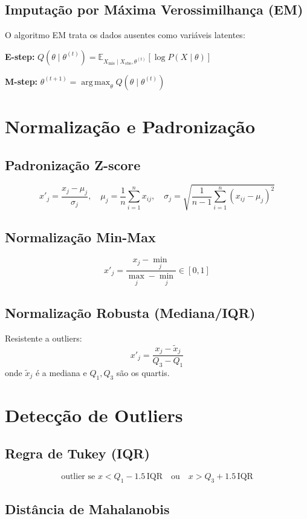 \documentclass[12pt,a4paper,twoside]{book}
\theoremstyle{definition}
\theoremstyle{remark}
\newcommand{\E}{\mathbb{E}}
\DeclareMathOperator*{\argmax}{arg\,max}
\begin{document}
\subsection{Imputação por Máxima Verossimilhança (EM)}

O algoritmo EM trata os dados ausentes como variáveis latentes:

\textbf{E-step:} $Q(\theta \mid \theta^{(t)}) = \E_{X_{\text{mis}} \mid X_{\text{obs}}, \theta^{(t)}}[\log P(X \mid \theta)]$

\textbf{M-step:} $\theta^{(t+1)} = \argmax_\theta Q(\theta \mid \theta^{(t)})$

\section{Normalização e Padronização}

\subsection{Padronização Z-score}
\[
x'_j = \frac{x_j - \mu_j}{\sigma_j}, \quad \mu_j = \frac{1}{n}\sum_{i=1}^n x_{ij},\quad \sigma_j = \sqrt{\frac{1}{n-1}\sum_{i=1}^n(x_{ij}-\mu_j)^2}
\]

\subsection{Normalização Min-Max}
\[
x'_j = \frac{x_j - \min_j}{\max_j - \min_j} \in [0,1]
\]

\subsection{Normalização Robusta (Mediana/IQR)}

Resistente a outliers:
\[
x'_j = \frac{x_j - \tilde{x}_j}{Q_3 - Q_1}
\]
onde $\tilde{x}_j$ é a mediana e $Q_1, Q_3$ são os quartis.

\section{Detecção de Outliers}

\subsection{Regra de Tukey (IQR)}
\[
\text{outlier se } x < Q_1 - 1.5\,\mathrm{IQR} \quad \text{ou} \quad x > Q_3 + 1.5\,\mathrm{IQR}
\]

\subsection{Distância de Mahalanobis}
\end{document}
